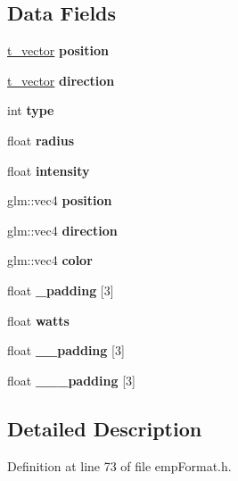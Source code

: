 \subsection*{Data Fields}
\begin{DoxyCompactItemize}
\item 
\hyperlink{structt__vector}{t\+\_\+vector} {\bfseries position}\hypertarget{structt__light_adc7b248af00db9027c4d701c30e9b2d5}{}\label{structt__light_adc7b248af00db9027c4d701c30e9b2d5}

\item 
\hyperlink{structt__vector}{t\+\_\+vector} {\bfseries direction}\hypertarget{structt__light_adf4435a9a71a1b7168fc90cdcf0dbfc3}{}\label{structt__light_adf4435a9a71a1b7168fc90cdcf0dbfc3}

\item 
int {\bfseries type}\hypertarget{structt__light_a236550cb15d829d19ad1bab2589e3c84}{}\label{structt__light_a236550cb15d829d19ad1bab2589e3c84}

\item 
float {\bfseries radius}\hypertarget{structt__light_a5eed05f89471a0ccccbe0b97f9650540}{}\label{structt__light_a5eed05f89471a0ccccbe0b97f9650540}

\item 
float {\bfseries intensity}\hypertarget{structt__light_a146af6ba866f29394efe9c3592236911}{}\label{structt__light_a146af6ba866f29394efe9c3592236911}

\item 
glm\+::vec4 {\bfseries position}\hypertarget{structt__light_ab0df9eeff92ed5de12548c094e4c40b2}{}\label{structt__light_ab0df9eeff92ed5de12548c094e4c40b2}

\item 
glm\+::vec4 {\bfseries direction}\hypertarget{structt__light_ab585e80edc9fe1fc39d0511b7dfdc43e}{}\label{structt__light_ab585e80edc9fe1fc39d0511b7dfdc43e}

\item 
glm\+::vec4 {\bfseries color}\hypertarget{structt__light_a4faf72cc7f4643cd0fd582a5ccac4a85}{}\label{structt__light_a4faf72cc7f4643cd0fd582a5ccac4a85}

\item 
float {\bfseries \+\_\+padding} \mbox{[}3\mbox{]}\hypertarget{structt__light_a18c2c9a9422be96307c81fd693e7b9a5}{}\label{structt__light_a18c2c9a9422be96307c81fd693e7b9a5}

\item 
float {\bfseries watts}\hypertarget{structt__light_a49be6dfbccf90874a105361cd162f79c}{}\label{structt__light_a49be6dfbccf90874a105361cd162f79c}

\item 
float {\bfseries \+\_\+\+\_\+padding} \mbox{[}3\mbox{]}\hypertarget{structt__light_a8c253ef5be03c89448fee9d86c4f33f4}{}\label{structt__light_a8c253ef5be03c89448fee9d86c4f33f4}

\item 
float {\bfseries \+\_\+\+\_\+\+\_\+padding} \mbox{[}3\mbox{]}\hypertarget{structt__light_a34023d464603341c389058e171e00a5c}{}\label{structt__light_a34023d464603341c389058e171e00a5c}

\end{DoxyCompactItemize}


\subsection{Detailed Description}


Definition at line 73 of file emp\+Format.\+h.

